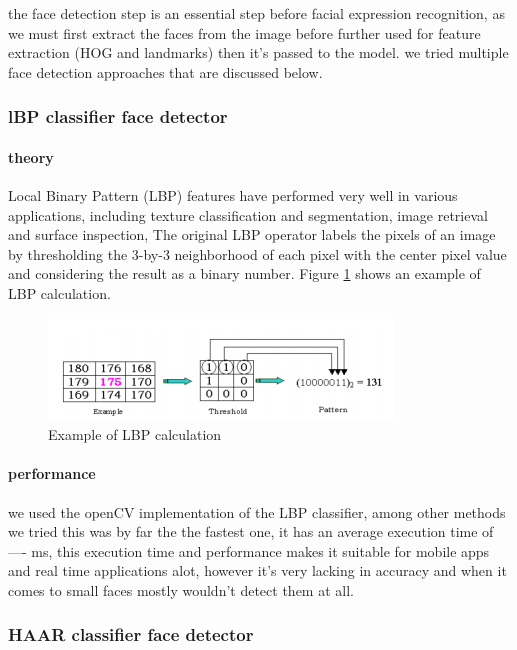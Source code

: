 the face detection step is an essential step before facial expression recognition, as we must first extract the faces from the image before further used for feature extraction (HOG and landmarks) then it's passed to the model.
\newline
we tried multiple face detection approaches that are discussed below.
\subsubsection{lBP classifier face detector}

\paragraph{theory}
Local Binary Pattern (LBP) features have performed very well in various applications, including texture classification and segmentation, image retrieval and surface inspection, The original LBP operator labels the pixels of an image by thresholding the 3-by-3 neighborhood of each pixel with the
center pixel value and considering the result as a binary number.
Figure \ref{fig:LBP_calculation} shows an example of LBP calculation. 

\begin{figure}
	\centering
	\includegraphics{images/LBP_classifier.png}
	\caption{Example of LBP calculation}
	\label{fig:LBP_calculation}
\end{figure}

\paragraph{performance}
we used the openCV implementation of the LBP classifier, among other methods we tried this was by far the the fastest one, it has an average execution time of ---- ms, this execution time and performance makes it suitable for mobile apps and real time applications alot, however it's very lacking in accuracy and when it comes to small faces mostly wouldn't detect them at all. 

\subsubsection{HAAR classifier face detector}

